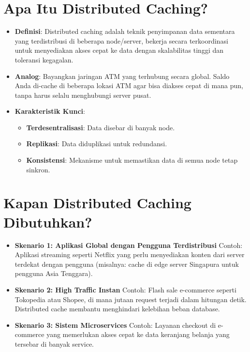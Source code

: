 \documentclass[11pt, a4paper]{book}
\begin{document}
	\section{Apa Itu Distributed Caching?}
	\label{sec:pengertian}
	
	\begin{itemize}
		\item \textbf{Definisi}:  
		Distributed caching adalah teknik penyimpanan data sementara yang terdistribusi di beberapa node/server, bekerja secara terkoordinasi untuk menyediakan akses cepat ke data dengan skalabilitas tinggi dan toleransi kegagalan.
		
		\item \textbf{Analog}:  
		Bayangkan jaringan ATM yang terhubung secara global. Saldo Anda di-cache di beberapa lokasi ATM agar bisa diakses cepat di mana pun, tanpa harus selalu menghubungi server pusat.
		
		\item \textbf{Karakteristik Kunci}:
		\begin{itemize}
			\item \textbf{Terdesentralisasi}: Data disebar di banyak node.
			\item \textbf{Replikasi}: Data diduplikasi untuk redundansi.
			\item \textbf{Konsistensi}: Mekanisme untuk memastikan data di semua node tetap sinkron.
		\end{itemize}
	\end{itemize}
	
	\section{Kapan Distributed Caching Dibutuhkan?}
	\label{sec:kapan-digunakan}
	
	\begin{itemize}
		\item \textbf{Skenario 1: Aplikasi Global dengan Pengguna Terdistribusi}  
		Contoh: Aplikasi streaming seperti Netflix yang perlu menyediakan konten dari server terdekat dengan pengguna (misalnya: cache di edge server Singapura untuk pengguna Asia Tenggara).
		
		\item \textbf{Skenario 2: High Traffic Instan}  
		Contoh: Flash sale e-commerce seperti Tokopedia atau Shopee, di mana jutaan request terjadi dalam hitungan detik. Distributed cache membantu menghindari kelebihan beban database.
		
		\item \textbf{Skenario 3: Sistem Microservices}  
		Contoh: Layanan checkout di e-commerce yang memerlukan akses cepat ke data keranjang belanja yang tersebar di banyak service.
	\end{itemize}
	
\end{document}
